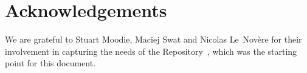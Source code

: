 \documentclass[11pt,a4paper]{article}
\begin{document}
\section*{Acknowledgements}
 We are grateful to Stuart Moodie, Maciej Swat and  Nicolas Le~Nov{\`e}re for their involvement in capturing the needs of the Repository~\cite{mli:req}, which was the starting point for this document.

\clearpage
{}
\setcounter{page}{1}
\tableofcontents
\listoffigures
\clearpage

\printglossaries
\clearpage











%
\clearpage


\end{document}

